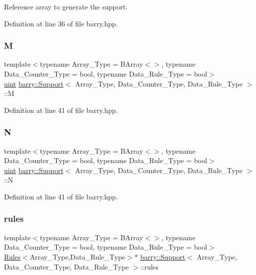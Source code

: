 Reference array to generate the support. 



Definition at line 36 of file barry.\+hpp.

\mbox{\label{classbarry_1_1_support_abdf54592050a1c0db0fc7b079a7f9703}} 
\subsubsection{\texorpdfstring{M}{M}}
{\footnotesize\ttfamily template$<$typename Array\+\_\+\+Type = B\+Array$<$$>$, typename Data\+\_\+\+Counter\+\_\+\+Type = bool, typename Data\+\_\+\+Rule\+\_\+\+Type = bool$>$ \\
\hyperlink{namespacebarry_a11dfc53ddb4672278319aa04f1e09a6c}{uint} \hyperlink{classbarry_1_1_support}{barry\+::\+Support}$<$ Array\+\_\+\+Type, Data\+\_\+\+Counter\+\_\+\+Type, Data\+\_\+\+Rule\+\_\+\+Type $>$\+::M}



Definition at line 41 of file barry.\+hpp.

\mbox{\label{classbarry_1_1_support_a776221deb92d113e5dee1cb100174ed4}} 
\subsubsection{\texorpdfstring{N}{N}}
{\footnotesize\ttfamily template$<$typename Array\+\_\+\+Type = B\+Array$<$$>$, typename Data\+\_\+\+Counter\+\_\+\+Type = bool, typename Data\+\_\+\+Rule\+\_\+\+Type = bool$>$ \\
\hyperlink{namespacebarry_a11dfc53ddb4672278319aa04f1e09a6c}{uint} \hyperlink{classbarry_1_1_support}{barry\+::\+Support}$<$ Array\+\_\+\+Type, Data\+\_\+\+Counter\+\_\+\+Type, Data\+\_\+\+Rule\+\_\+\+Type $>$\+::N}



Definition at line 41 of file barry.\+hpp.

\mbox{\label{classbarry_1_1_support_a9311c3288f59feaece0680f9a7b630dd}} 
\subsubsection{\texorpdfstring{rules}{rules}}
{\footnotesize\ttfamily template$<$typename Array\+\_\+\+Type = B\+Array$<$$>$, typename Data\+\_\+\+Counter\+\_\+\+Type = bool, typename Data\+\_\+\+Rule\+\_\+\+Type = bool$>$ \\
\hyperlink{classbarry_1_1_rules}{Rules}$<$Array\+\_\+\+Type,Data\+\_\+\+Rule\+\_\+\+Type$>$$\ast$ \hyperlink{classbarry_1_1_support}{barry\+::\+Support}$<$ Array\+\_\+\+Type, Data\+\_\+\+Counter\+\_\+\+Type, Data\+\_\+\+Rule\+\_\+\+Type $>$\+::rules}



